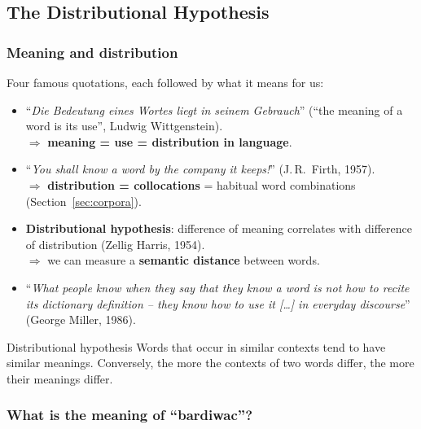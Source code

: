 \subsection{The Distributional Hypothesis}
\label{sec:distributional-hypothesis}

\subsubsection{Meaning and distribution}

Four famous quotations, each followed by what it means for us:

\begin{itemize}
  \item ``\emph{Die Bedeutung eines Wortes liegt in seinem Gebrauch}'' (``the meaning of
        a word is its use'', Ludwig Wittgenstein).\\
        $\Rightarrow$ \textbf{meaning = use = distribution in language}.
  \item ``\emph{You shall know a word by the company it keeps!}'' (J.\,R.~Firth, 1957).\\
        $\Rightarrow$ \textbf{distribution = collocations} = habitual word combinations
        (Section~\ref{sec:corpora}).
  \item \textbf{Distributional hypothesis}: difference of meaning correlates with
        difference of distribution (Zellig Harris, 1954).\\
        $\Rightarrow$ we can measure a \textbf{semantic distance} between words.
  \item ``\emph{What people know when they say that they know a word is not how to recite
        its dictionary definition -- they know how to use it [\ldots] in everyday
        discourse}'' (George Miller, 1986).
\end{itemize}

\begin{nbdef}{Distributional hypothesis}
Words that occur in similar contexts tend to have similar meanings. Conversely, the more
the contexts of two words differ, the more their meanings differ.
\end{nbdef}

\subsubsection{What is the meaning of ``bardiwac''?}

